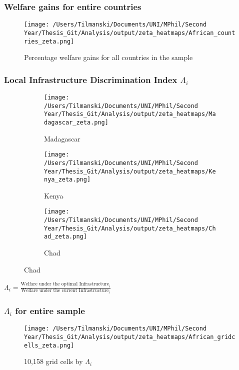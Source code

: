 \documentclass[]{beamer}   	%
\begin{document}
\begin{frame}
\label{country_map}
\frametitle{Welfare gains for entire countries}
\begin{figure}
    \texttt{[image: /Users/Tilmanski/Documents/UNI/MPhil/Second Year/Thesis\_Git/Analysis/output/zeta\_heatmaps/African\_countries\_zeta.png]}
    \caption{Percentage welfare gains for all countries in the sample}
  \end{figure}
\end{frame}

\begin{frame}
  \frametitle{Local Infrastructure Discrimination Index $\Lambda_{i}$}
\begin{figure}
\caption{$\Lambda_{i}$ for sample countries}
\begin{subfigure}[c]{0.32\textwidth}
\texttt{[image: /Users/Tilmanski/Documents/UNI/MPhil/Second Year/Thesis\_Git/Analysis/output/zeta\_heatmaps/Madagascar\_zeta.png]}
\caption{Madagascar}
\label{fig:Madagascar_zeta}
\end{subfigure}
\begin{subfigure}[c]{0.32\textwidth}
\texttt{[image: /Users/Tilmanski/Documents/UNI/MPhil/Second Year/Thesis\_Git/Analysis/output/zeta\_heatmaps/Kenya\_zeta.png]}
\caption{Kenya}
\label{fig:Kenya_zeta}
\end{subfigure}
\begin{subfigure}[c]{0.32\textwidth}
\texttt{[image: /Users/Tilmanski/Documents/UNI/MPhil/Second Year/Thesis\_Git/Analysis/output/zeta\_heatmaps/Chad\_zeta.png]}
\caption{Chad}
\label{fig:Chad_zeta}
\end{subfigure}
\end{figure}
\centering
$\Lambda_{i} = \frac{\textrm{Welfare under the optimal Infrastructure}_{i}}{\textrm{Welfare under the current Infrastructure}_{i}}$
\end{frame}

\begin{frame}
  \frametitle{$\Lambda_{i}$ for entire sample}
    \label{Grid_Cell_Map}
  \begin{figure}
    \texttt{[image: /Users/Tilmanski/Documents/UNI/MPhil/Second Year/Thesis\_Git/Analysis/output/zeta\_heatmaps/African\_gridcells\_zeta.png]}
    \caption{10,158 grid cells by $\Lambda_{i}$}
  \end{figure}
\end{frame}
\end{document}
